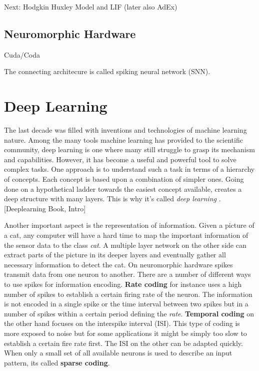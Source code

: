 Next: Hodgkin Huxley Model and LIF (later also AdEx)


\subsection{Neuromorphic Hardware}
Cuda/Coda

The connecting architecure is called spiking neural network (SNN).


\section{Deep Learning}
% 
The last decade was filled with inventions and technologies of machine learning nature. Among the many tools machine learning has provided to the scientific community, deep learning is one where many still struggle to grasp its mechanism and capabilities. However, it has become a useful and powerful tool to solve complex tasks. One approach is to understand such a task in terms of a hierarchy of concepts. Each concept is based upon a combination of simpler ones. Going done on a hypothetical ladder towards the easiest concept available, creates a deep structure with many layers. This is why it's called \textit{deep learning} . [Deeplearning Book, Intro]

Another important aspect is the representation of information. Given a picture of a cat, any computer will have a hard time to map the important information of the sensor data to the class \textit{cat}. A multiple layer network on the other side can extract parts of the picture in its deeper layers and eventually gather all necessary information to detect the cat. On neuromorphic hardware spikes transmit data from one neuron to another. There are a number of different ways to use spikes for information encoding. \textbf{Rate coding} for instance uses a high number of spikes to establish a certain firing rate of the neuron. The information is not encoded in a single spike or the time interval between two spikes but in a number of spikes within a certain period defining the \textit{rate}. \textbf{Temporal coding} on the other hand focuses on the interspike interval (ISI). This type of coding is more exposed to noise but for some applications it might be simply too slow to establish a certain fire rate first. The ISI on the other can be adapted quickly. When only a small set of all available neurons is used to describe an input pattern, its called \textbf{sparse coding}.\\


